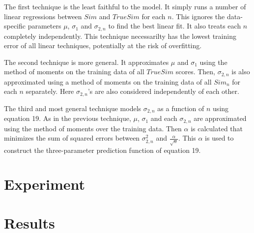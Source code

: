 \documentclass[11pt]{article}
\begin{document}
The first technique is the least faithful to the model. It simply runs a number
of linear regressions between $Sim$ and $TrueSim$ for each $n$. This ignores the 
data-specific parameters $\mu$, $\sigma_{1}$ and $\sigma_{2,n}$ to find the best 
linear fit. It also treats each $n$ completely independently. This technique 
necessarilty has the lowest training error of all linear techniques, potentially 
at the risk of overfitting.

The second technique is more general. It approximates $\mu$ and $\sigma_{1}$
using the method of moments on the training data of all $TrueSim$ scores. Then,
$\sigma_{2,n}$ is also approximated using a method of moments on the training
data of all $Sim_n$ for each $n$ separately. Here $\sigma_{2,n}$'s are also
considered independently of each other.

The third and most general technique models $\sigma_{2,n}$ as a function of
$n$ using equation 19. As in the previous technique, $\mu$, $\sigma_{1}$ and each
$\sigma_{2,n}$ are approximated using the method of moments over the training
data. Then $\alpha$ is calculated that minimizes the sum of squared errors
between $\sigma_{2,n}^2$ and $\frac{\alpha}{\sqrt{n}}$. This $\alpha$ is used to
construct the three-parameter prediction function of equation 19.

\section*{Experiment}

\section*{Results}
\end{document}
